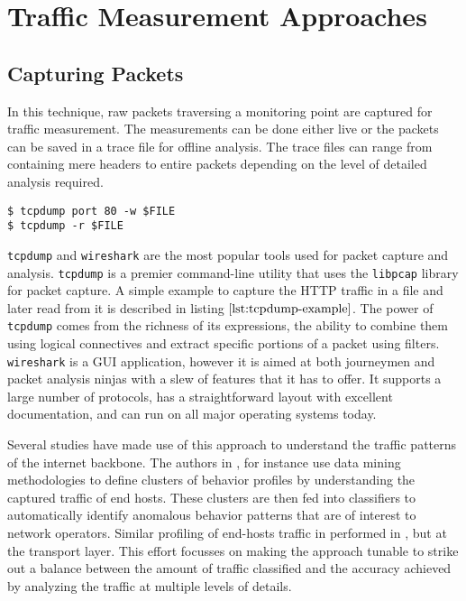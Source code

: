 \chapter{Traffic Measurement Approaches}\label{ch:traffic-measurement-approaches}

\section{Capturing Packets}\label{sec:capturing-packets}
In this technique, raw packets traversing a monitoring point are captured for traffic measurement. The measurements can be done either live or the packets can be saved in a trace file for offline analysis. The trace files can range from containing mere headers to entire packets depending on the level of detailed analysis required. 

\begin{lstlisting}
$ tcpdump port 80 -w $FILE
$ tcpdump -r $FILE
\end{lstlisting}

\texttt{tcpdump} and \texttt{wireshark} are the most popular tools used for packet capture and analysis. \texttt{tcpdump} \cite{tcpdump-manpage} is a premier command-line utility that uses the \texttt{libpcap} \cite{pcap-manpage} library for packet capture. A simple example to capture  the \ac{HTTP} traffic in a file and later read from it is described in listing $\ref{lst:tcpdump-example}$. The power of \texttt{tcpdump}  comes from the richness of its expressions, the ability to combine them using logical connectives and extract specific portions of a packet using filters. \texttt{wireshark} \cite{wireshark-manpage} is a \ac{GUI} application, however it is aimed at both journeymen and packet analysis  ninjas with a slew of features that it has to offer. It supports a large number of protocols, has a straightforward layout with excellent documentation, and can run on all major operating systems today. 

Several studies have made use of this approach to understand the traffic patterns of the internet backbone. The authors in \cite{kxu:2005}, for instance use data mining methodologies to define clusters of behavior profiles by understanding the captured traffic of end hosts.  These clusters are then fed into classifiers to  automatically identify anomalous behavior patterns that are of interest to network operators. Similar profiling of end-hosts traffic in performed in \cite{tkaragiannis:2005}, but at the transport layer. This effort focusses on making the approach tunable to strike out a balance between the amount of traffic classified and the accuracy achieved by analyzing the traffic at multiple levels of details. 

